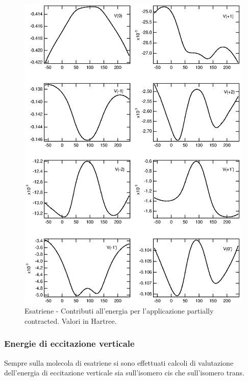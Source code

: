 \begin{figure}[ht]
\begin{center}
\includegraphics[angle=0,width=14cm,keepaspectratio]{immagini/esatriene/energie_pc.eps}
\caption{\small Esatriene - Contributi all'energia per l'applicazione
partially contracted. Valori in Hartree. }
\label{fig:esatriene_energie_pc}
\end{center}
\end{figure}
\pagebreak

\clearpage

\subsubsection{Energie di eccitazione verticale}

Sempre sulla molecola di esatriene si sono effettuati calcoli di valutazione
dell'energia di eccitazione verticale sia sull'isomero cis che sull'isomero
trans.

